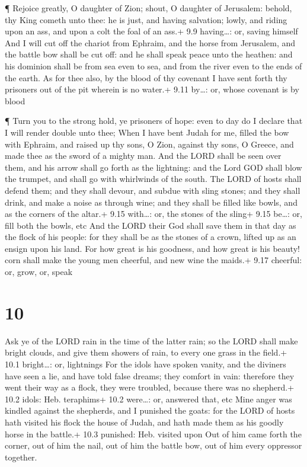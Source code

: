  ¶ Rejoice greatly, O daughter of Zion; shout, O daughter of
Jerusalem: behold, thy King cometh unto thee: he is just, and having
salvation; lowly, and riding upon an ass, and upon a colt the foal of an
ass.+ 9.9 having\ldots: or, saving himself  And I will cut
off the chariot from Ephraim, and the horse from Jerusalem, and the
battle bow shall be cut off: and he shall speak peace unto the heathen:
and his dominion shall be from sea even to sea, and from the river even
to the ends of the earth.  As for thee also, by the blood
of thy covenant I have sent forth thy prisoners out of the pit wherein
is no water.+ 9.11 by\ldots: or, whose covenant is by blood

 ¶ Turn you to the strong hold, ye prisoners of hope: even
to day do I declare that I will render double unto thee; 
When I have bent Judah for me, filled the bow with Ephraim, and raised
up thy sons, O Zion, against thy sons, O Greece, and made thee as the
sword of a mighty man.  And the LORD shall be seen over
them, and his arrow shall go forth as the lightning: and the Lord GOD
shall blow the trumpet, and shall go with whirlwinds of the south.
 The LORD of hosts shall defend them; and they shall
devour, and subdue with sling stones; and they shall drink, and make a
noise as through wine; and they shall be filled like bowls, and as the
corners of the altar.+ 9.15 with\ldots: or, the stones of the sling+
9.15 be\ldots: or, fill both the bowls, etc  And the LORD
their God shall save them in that day as the flock of his people: for
they shall be as the stones of a crown, lifted up as an ensign upon his
land.  For how great is his goodness, and how great is his
beauty! corn shall make the young men cheerful, and new wine the maids.+
9.17 cheerful: or, grow, or, speak

\hypertarget{section-9}{%
\section{10}\label{section-9}}

 Ask ye of the LORD rain in the time of the latter rain; so
the LORD shall make bright clouds, and give them showers of rain, to
every one grass in the field.+ 10.1 bright\ldots: or, lightnings
 For the idols have spoken vanity, and the diviners have
seen a lie, and have told false dreams; they comfort in vain: therefore
they went their way as a flock, they were troubled, because there was no
shepherd.+ 10.2 idols: Heb. teraphims+ 10.2 were\ldots: or, answered
that, etc  Mine anger was kindled against the shepherds, and
I punished the goats: for the LORD of hosts hath visited his flock the
house of Judah, and hath made them as his goodly horse in the battle.+
10.3 punished: Heb. visited upon  Out of him came forth the
corner, out of him the nail, out of him the battle bow, out of him every
oppressor together.

